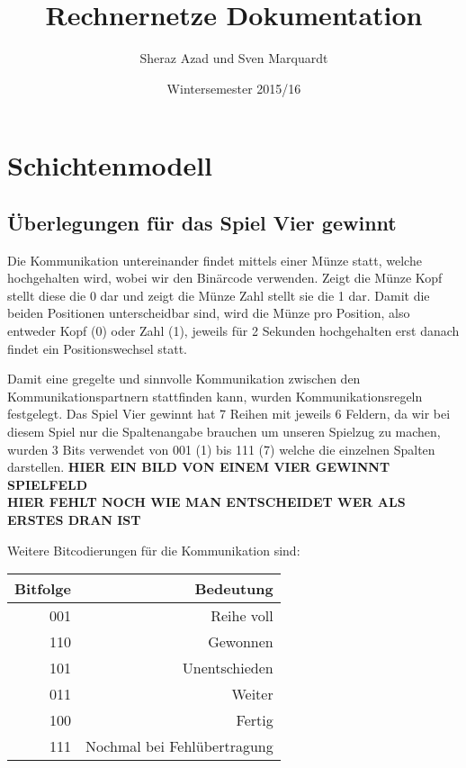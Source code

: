 \documentclass{scrartcl}
\begin{document}
  \title{Rechnernetze Dokumentation}
  \author{Sheraz Azad und Sven Marquardt}
  \date{Wintersemester 2015/16}
  \maketitle
  
  \tableofcontents
 
  \newpage
\section[Versuch 1 Schichtenmodell]{Schichtenmodell}  
  \subsection[Aufgabe 2 Überlegungen für das Spiel Vier gewinnt]{Überlegungen für das Spiel Vier gewinnt}
  
  Die Kommunikation untereinander findet mittels einer Münze statt, welche hochgehalten wird, wobei wir den Binärcode verwenden. Zeigt die Münze Kopf stellt diese die 0 dar und zeigt die Münze Zahl stellt sie die 1 dar. Damit die beiden Positionen unterscheidbar sind, wird die Münze pro Position, also entweder Kopf (0) oder Zahl (1), jeweils für 2 Sekunden hochgehalten erst danach findet ein Positionswechsel statt.
    
  Damit eine gregelte und sinnvolle Kommunikation zwischen den Kommunikationspartnern stattfinden kann, wurden Kommunikationsregeln festgelegt. Das Spiel Vier gewinnt hat 7 Reihen mit jeweils 6 Feldern, da wir bei diesem Spiel nur die Spaltenangabe brauchen um unseren Spielzug zu machen, wurden 3 Bits verwendet von 001 (1) bis 111 (7) welche die einzelnen Spalten darstellen.
  \textbf{HIER EIN BILD VON EINEM VIER GEWINNT SPIELFELD}\\
  \textbf{HIER FEHLT NOCH WIE MAN ENTSCHEIDET WER ALS ERSTES DRAN IST}
  
  Weitere Bitcodierungen für die Kommunikation sind:

    \begin{tabular}{|r|r}
      \textbf{Bitfolge} & \textbf{Bedeutung} \\ \hline
        001 & Reihe voll \\
      110 & Gewonnen \\
      101 & Unentschieden \\
      011 & Weiter \\
      100 & Fertig \\
      111 & Nochmal bei Fehlübertragung 
    \end{tabular}
    
\end{document}
